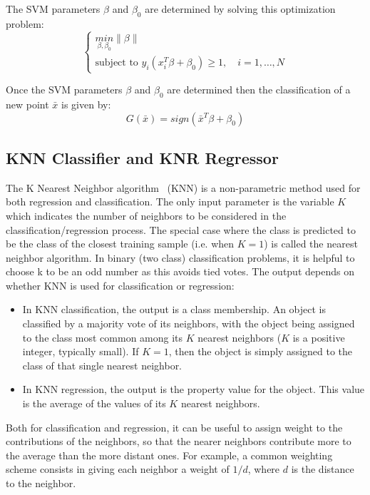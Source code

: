 The SVM parameters $\beta$ and $\beta_0$  are determined by solving this optimization problem:
\begin{equation}
\left\{\begin{matrix}
\underset{\beta,\beta_0}{min} \left \| \beta \right \|\\ 
\text{subject to } y_i(x_{i}^{T}\beta+\beta_0)\geq 1 , \quad i=1,\dots,N
\end{matrix}\right.
\end{equation}

Once the SVM parameters $\beta$ and $\beta_0$ are determined then the classification of a new point $\bar{x}$ is given by:
\begin{equation}
G(\bar{x})=sign(\bar{x}^T\beta+\beta_0)
\end{equation}


\subsection{KNN Classifier and KNR Regressor}
\label{sec:KNN_KNR}
The K Nearest Neighbor algorithm~\cite{altman_KNN} (KNN) is a non-parametric method used for both regression and classification. The only input parameter is the variable $K$ which indicates the number of neighbors to be considered in the classification/regression process. The special case where the class is predicted to be the class of the closest training sample (i.e. when $K = 1$) is called the nearest neighbor algorithm. In binary (two class) classification problems, it is helpful to choose k to be an odd number as this avoids tied votes. The output depends on whether KNN is used for classification or regression:
\begin{itemize}
\item In KNN classification, the output is a class membership. An object is classified by a majority vote of its neighbors, with the object being assigned to the class most common among its $K$ nearest neighbors ($K$ is a positive integer, typically small). If $K = 1$, then the object is simply assigned to the class of that single nearest neighbor.
\item In KNN regression, the output is the property value for the object. This value is the average of the values of its $K$ nearest neighbors.
\end{itemize}
Both for classification and regression, it can be useful to assign weight to the contributions of the neighbors, so that the nearer neighbors contribute more to the average than the more distant ones. For example, a common weighting scheme consists in giving each neighbor a weight of $1/d$, where $d$ is the distance to the neighbor.



